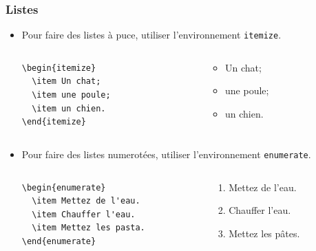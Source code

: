 \begin{frame}[fragile]
  \frametitle{Listes}
  \begin{itemize}
    \item Pour faire des listes à puce, utiliser l'environnement \lstinline|itemize|.
    \begin{columns}
      \begin{column}{0.45\textwidth}
        \begin{lstlisting}[style=nonumbers]
\begin{itemize}
  \item Un chat;
  \item une poule;
  \item un chien.
\end{itemize}
        \end{lstlisting}
      \end{column}
      \begin{column}{0.45\textwidth}
        \begin{itemize}
          \item Un chat;
          \item une poule;
          \item un chien.
        \end{itemize}
      \end{column}
    \end{columns}

    \item Pour faire des listes numerotées, utiliser l'environnement \lstinline|enumerate|.
    \begin{columns}
      \begin{column}{0.45\textwidth}
        \begin{lstlisting}[style=nonumbers]
\begin{enumerate}
  \item Mettez de l'eau.
  \item Chauffer l'eau.
  \item Mettez les pasta.
\end{enumerate}
        \end{lstlisting}
      \end{column}
      \begin{column}{0.45\textwidth}
        \begin{enumerate}
          \item Mettez de l'eau.
          \item Chauffer l'eau.
          \item Mettez les pâtes.
        \end{enumerate}
      \end{column}
    \end{columns}
  \end{itemize}
\end{frame}

